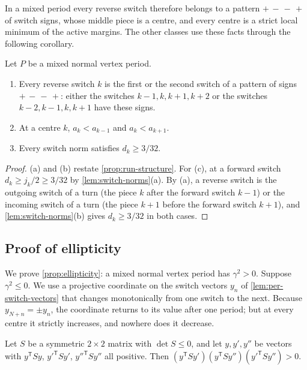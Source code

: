 In a mixed period every reverse switch therefore belongs to a pattern $+\,-\,-\,+$ of switch
signs, whose middle piece is a centre, and every centre is a strict local minimum of the active
margins. The other classes use these facts through the following corollary.

\begin{corollary}\label{cor:rev-mixed}
Let $P$ be a mixed normal vertex period.
\begin{enumerate}[label=\textup{(\alph*)}]
\item Every reverse switch $k$ is the first or the second switch of a pattern of signs
  $+\,-\,-\,+$: either the switches $k-1,k,k+1,k+2$ or the switches $k-2,k-1,k,k+1$ have these
  signs.
\item At a centre $k$, $a_k<a_{k-1}$ and $a_k<a_{k+1}$.
\item Every switch norm satisfies $d_k\ge3/32$.
\end{enumerate}
\end{corollary}

\begin{proof}
(a) and (b) restate \cref{prop:run-structure}. For (c), at a forward switch
$d_k\ge j_k/2\ge3/32$ by \cref{lem:switch-norms}(a). By (a), a reverse switch is the outgoing
switch of a turn (the piece $k$ after the forward switch $k-1$) or the incoming switch of a turn
(the piece $k+1$ before the forward switch $k+1$), and \cref{lem:switch-norms}(b) gives
$d_k\ge3/32$ in both cases.
\end{proof}

\subsection{Proof of ellipticity}\label{sec:rev-ellipticity}

We prove \cref{prop:ellipticity}: a mixed normal vertex period has $\gamma^2>0$. Suppose
$\gamma^2\le0$. We use a projective coordinate on the switch vectors $y_n$ of
\cref{lem:per-switch-vectors} that changes monotonically from one switch to the next. Because
$y_{N+n}=\pm y_n$, the coordinate returns to its value after one period; but at every centre it
strictly increases, and nowhere does it decrease.

\begin{lemma}\label{lem:rev-three-gram}
Let $S$ be a symmetric $2\times2$ matrix with $\det S\le0$, and let $y,y',y''$ be vectors with
$y^{\mathsf T}Sy$, $y'^{\mathsf T}Sy'$, $y''^{\mathsf T}Sy''$ all positive. Then
$(y^{\mathsf T}Sy')(y^{\mathsf T}Sy'')(y'^{\mathsf T}Sy'')>0$.
\end{lemma}

